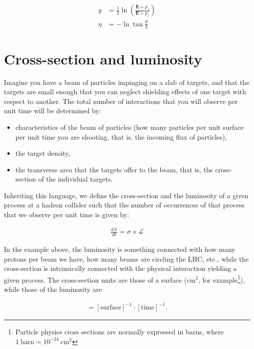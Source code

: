 \begin{align*}
y &= \frac{1}{2} \ln \left(\frac{\mathbf{E} + p_z}{\mathbf{E} + p_z} \right) \\
\eta &= -\ln \tan \frac{\theta}{2}
\end{align*}

\section{Cross-section and luminosity}
\label{sec:cross_section_lumi}

Imagine you have a beam of particles impinging on a slab of targets, and that the targets are small enough that you can neglect shielding effects of one target with respect to another. The total number of interactions that you will observe per unit time will be determined by:

\begin{itemize}
\item characteristics of the beam of particles (how many particles per unit surface per unit time you are shooting, that is, the incoming flux of particles),
\item the target density,
\item the transverse area that the targets offer to the beam, that is, the cross-section of the individual targets. 
\end{itemize}

Inheriting this language, we define the cross-section and the luminosity of a given process at a hadron collider such that the number of occurrences of that process that we observe per unit time is given by: 

\begin{align}
\frac{dN}{dt} = \sigma \times \mathcal{L}
\end{align} 

In the example above, the luminosity is something connected with how many protons per beam we have, how many beams are circling the LHC, etc., while the cross-section is intrinsically connected with the physical interaction yielding a given process. The cross-section units are those of a surface (cm$^2$, for example\footnote{Particle physics cross sections are normally expressed in barns, where $1\ \mathrm{barn} = 10^{-24}\ \mathrm{cm}^2$}), while those of the luminosity are

\begin{align}
[\mathcal{L}] =  [\mathrm{surface}]^{-1}\cdot [\mathrm{time}]^{-1}.
\end{align}


